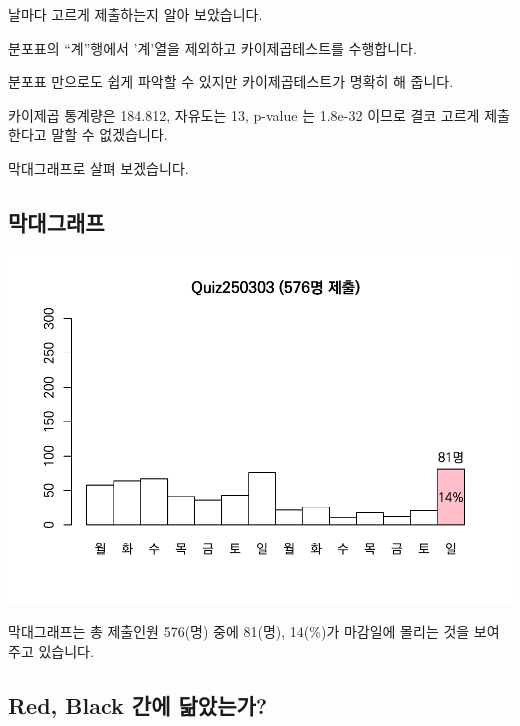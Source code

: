 \documentclass[
]{book}
\begin{document}
날마다 고르게 제출하는지 알아 보았습니다.

분포표의 ``계''행에서 '계'열을 제외하고 카이제곱테스트를 수행합니다.

분포표 만으로도 쉽게 파악할 수 있지만 카이제곱테스트가 명확히 해 줍니다.

카이제곱 통계량은 184.812, 자유도는 13, p-value 는 1.8e-32 이므로 결코 고르게 제출한다고 말할 수 없겠습니다.

막대그래프로 살펴 보겠습니다.

\subsection{막대그래프}\label{uxb9c9uxb300uxadf8uxb798uxd504}

\includegraphics{Quiz_report_2025_files/figure-latex/unnamed-chunk-18-1.pdf}

막대그래프는 총 제출인원 576(명) 중에 81(명), 14(\%)가 마감일에 몰리는 것을 보여주고 있습니다.

\subsection{Red, Black 간에 닮았는가?}\label{red-black-uxac04uxc5d0-uxb2eeuxc558uxb294uxac00}
\end{document}
